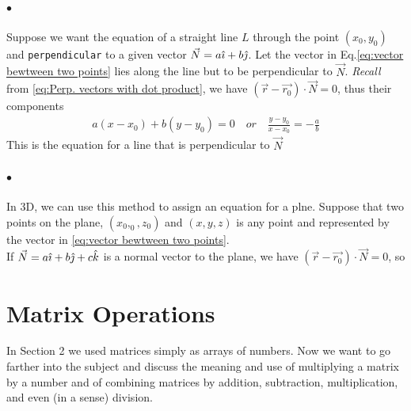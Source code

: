             \paragraph{$\bullet$} Suppose we want the equation of a 
            straight line $L$ through the point $(x_0, y_0)$ and \texttt{perpendicular} to a given vector $\vec{N} = a\hat{\imath} +b\hat{\jmath} $.
            Let the vector in Eq.\eqref{eq:vector bewtween two points} lies along the line but to be perpendicular
            to $\vec{N}$. \textit{Recall} from \eqref{eq:Perp. vectors with dot product}, we have 
            $(\vec{r}-\vec{r_0}) \cdot \vec{N} = 0$, thus their components
            \begin{align}
                \label{eq:Perp. line equation}
                a(x-x_0) + b(y-y_0) = 0 \quad or \quad \frac{y-y_0}{x-x_0} =- \frac{a}{b}
            \end{align}
            This is the equation for a line that is perpendicular to $\vec{N}$
    
            \paragraph{$\bullet$} In 3D, we can use this method to assign an equation for a plne. 
            Suppose that two points on the plane, $(x_0, _0, z_0)$ and $(x, y, z)$ is any point and represented by the
            vector in \eqref{eq:vector bewtween two points}.\\
            If $\vec{N} = a\hat{\imath} +b\hat{\jmath} +c\hat{k} $ is a normal vector to the plane, we have $(\vec{r}-\vec{r_0}) \cdot \vec{N} = 0$, so 

        \section{Matrix Operations}
            In Section 2 we used matrices simply as arrays of numbers. Now we want to go farther into the subject 
            and discuss the meaning and use of multiplying a matrix by a number and of combining matrices by addition, 
            subtraction, multiplication, and even (in a sense) division.
            
